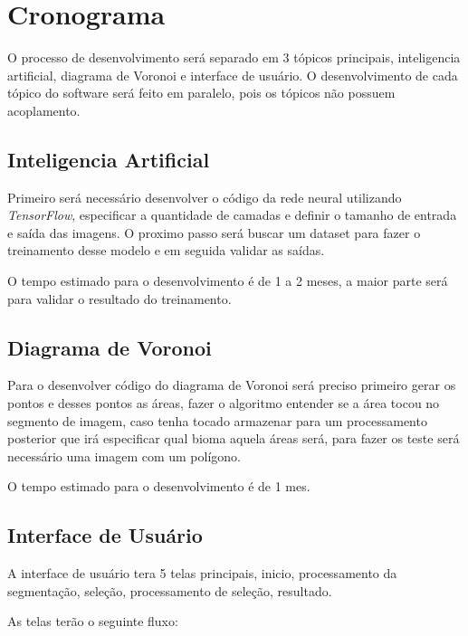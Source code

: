\section{Cronograma}

O processo de desenvolvimento será separado em 3 tópicos principais, inteligencia artificial, diagrama de Voronoi e interface de usuário. O desenvolvimento de cada tópico do software será feito em paralelo, pois os tópicos não possuem acoplamento.

\subsection*{Inteligencia Artificial}

Primeiro será necessário desenvolver o código da rede neural utilizando \textit{TensorFlow}, especificar a quantidade de camadas e definir o tamanho de entrada e saída das imagens.
O proximo passo será buscar um dataset para fazer o treinamento desse modelo e em seguida validar as saídas.

O tempo estimado para o desenvolvimento é de 1 a 2 meses, a maior parte será para validar o resultado do treinamento.

\subsection*{Diagrama de Voronoi}

Para o desenvolver código do diagrama de Voronoi será preciso primeiro gerar os pontos e desses pontos as áreas, fazer o algoritmo entender se a área tocou no segmento de imagem, caso tenha tocado armazenar para um processamento posterior que irá especificar qual bioma aquela áreas será, para fazer os teste será necessário uma imagem com um polígono.

O tempo estimado para o desenvolvimento é de 1 mes.

\subsection*{Interface de Usuário}

A interface de usuário tera 5 telas principais, inicio, processamento da segmentação, seleção, processamento de seleção, resultado. 

As telas terão o seguinte fluxo:


